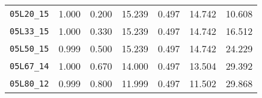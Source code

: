 \begin{table}[h]
\begin{tabular}{@{}lrrrrrr@{}}
  \verb|05L20_15| &                    1.000 &                   0.200 &   15.239 &                  0.497 &                14.742 &  10.608 \\
  \verb|05L33_15| &                    1.000 &                   0.330 &   15.239 &                  0.497 &                14.742 &  16.512 \\
  \verb|05L50_15| &                    0.999 &                   0.500 &   15.239 &                  0.497 &                14.742 &  24.229 \\
  \verb|05L67_14| &                    1.000 &                   0.670 &   14.000 &                  0.497 &                13.504 &  29.392 \\
  \verb|05L80_12| &                    0.999 &                   0.800 &   11.999 &                  0.497 &                11.502 &  29.868 \\
\bottomrule
\end{tabular}
\end{table}
